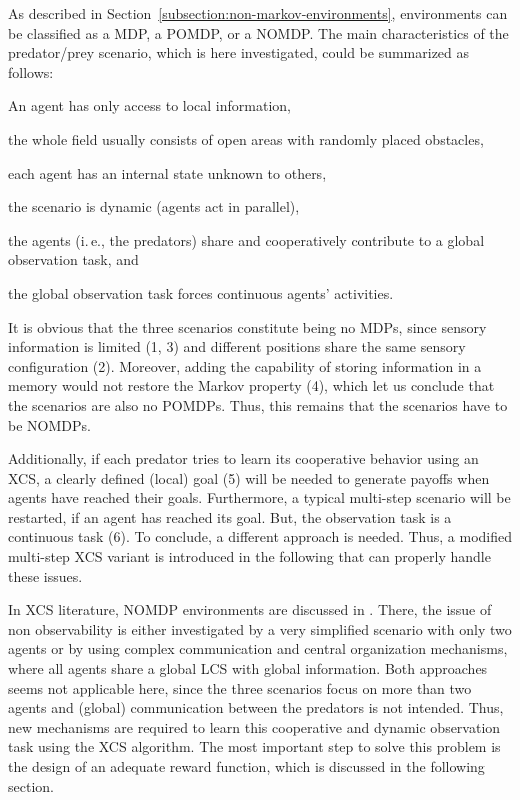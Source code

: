 As described in Section~\ref{subsection:non-markov-environments}, environments can be classified as a MDP, a POMDP, or a NOMDP. The main characteristics of the predator/prey scenario, which is here investigated, could be summarized as follows:

\begin{enumerate*}
	\item An agent has only access to local information,
	\item the whole field usually consists of open areas with randomly placed obstacles,
	\item each agent has an internal state unknown to others,
	\item the scenario is dynamic (agents act in parallel),
	\item the agents (i.\,e., the predators) share and cooperatively contribute to a glo\-bal observation task, and
	\item the global observation task forces continuous agents' activities.  
\end{enumerate*}

It is obvious that the three scenarios constitute being no MDPs, since sensory information is limited (1, 3) and different positions share the same sensory configuration (2). Moreover, adding the capability of storing information in a memory would not restore the Markov property (4), which let us conclude that the scenarios are also no POMDPs. Thus, this remains that the scenarios have to be NOMDPs. 

Additionally, if each predator tries to learn its cooperative behavior using an XCS, a clearly defined (local) goal (5) will be needed to generate payoffs when agents have reached their goals. Furthermore, a typical multi-step scenario will be restarted, if an agent has reached its goal. But, the observation task is a continuous task (6). %
To conclude, a different approach is needed. Thus, a modified multi-step XCS variant is introduced in the following that can properly handle these issues.

In XCS literature, NOMDP environments are discussed in \cite{Miyazaki2,TTS01}. There, the issue of non observability is either investigated by a very simplified scenario with only two agents or by using complex communication and central organization mechanisms, where all agents share a global LCS with global information. Both approaches seems not applicable here, since the three scenarios focus on more than two agents and (global) communication between the predators is not intended. Thus, new mechanisms are required to learn this cooperative and dynamic observation task using the XCS algorithm. The most important step to solve this problem is the design of an adequate reward function, which is discussed in the following section.
